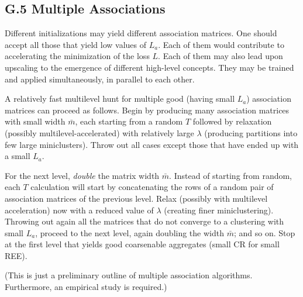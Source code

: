 \documentclass{article} %
\begin{document}
\subsection{G.5 Multiple Associations}
Different initializations may yield different association matrices. One should accept all those that yield low values of $L_a$. Each of them would contribute to accelerating the minimization of the loss $L$. Each of them may also lead upon upscaling to the emergence of different high-level concepts. They may be trained and applied simultaneously, in parallel to each other.

A relatively fast multilevel hunt for multiple good (having small $L_a$) association matrices can proceed as follows. Begin by producing many association matrices with small width $\bar{m}$, each starting from a random $T$ followed by relaxation (possibly multilevel-accelerated) with relatively large $\lambda$ (producing partitions into few large miniclusters). Throw out all cases except those that have ended up with a small $L_a$.

For the next level, {\it double} the matrix width $\bar{m}$. Instead of starting from random, each $T$ calculation will start by concatenating the rows of a random pair of association matrices of the previous level. Relax (possibly with multilevel acceleration) now with a reduced value of $\lambda$ (creating finer miniclustering). Throwing out again all the matrices that do not converge to a clustering with small $L_a$, proceed to the next level, again doubling the width $\bar{m}$; and so on. Stop at the first level that yields good coarsenable aggregates (small CR for small REE).

(This is just a preliminary outline of multiple association algorithms. Furthermore, an empirical study is required.)


































\end{document}
